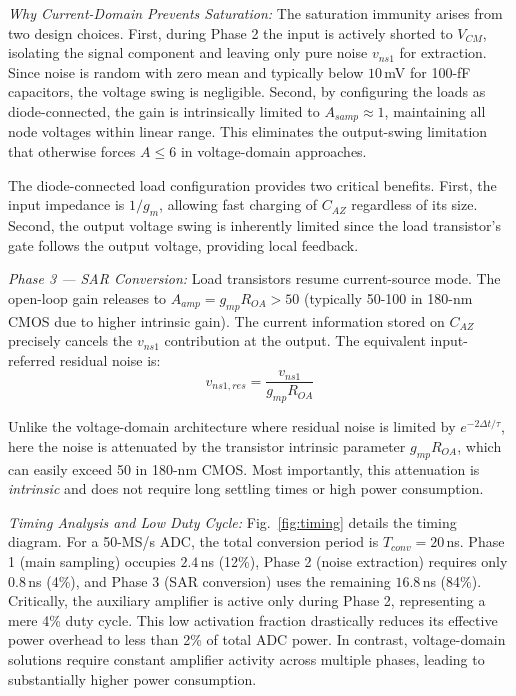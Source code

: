 \documentclass[journal]{IEEEtran}
\begin{document}
\textit{Why Current-Domain Prevents Saturation:} The saturation immunity arises from two design choices. First, during Phase 2 the input is actively shorted to $V_{CM}$, isolating the signal component and leaving only pure noise $v_{ns1}$ for extraction. Since noise is random with zero mean and typically below $10$\,mV for 100-fF capacitors, the voltage swing is negligible. Second, by configuring the loads as diode-connected, the gain is intrinsically limited to $A_{samp} \approx 1$, maintaining all node voltages within linear range. This eliminates the output-swing limitation that otherwise forces $A \leq 6$ in voltage-domain approaches.

The diode-connected load configuration provides two critical benefits. First, the input impedance is $1/g_m$, allowing fast charging of $C_{AZ}$ regardless of its size. Second, the output voltage swing is inherently limited since the load transistor's gate follows the output voltage, providing local feedback.

\textit{Phase 3 --- SAR Conversion:} Load transistors resume current-source mode. The open-loop gain releases to $A_{amp} = g_{mp}R_{OA} > 50$ (typically 50-100 in 180-nm CMOS due to higher intrinsic gain). The current information stored on $C_{AZ}$ precisely cancels the $v_{ns1}$ contribution at the output. The equivalent input-referred residual noise is:
\begin{equation}
v_{ns1,res} = \frac{v_{ns1}}{g_{mp}R_{OA}}
\label{eq:residual_current}
\end{equation}

Unlike the voltage-domain architecture where residual noise is limited by $e^{-2\Delta t/\tau}$, here the noise is attenuated by the transistor intrinsic parameter $g_{mp}R_{OA}$, which can easily exceed 50 in 180-nm CMOS. Most importantly, this attenuation is \textit{intrinsic} and does not require long settling times or high power consumption.

\textit{Timing Analysis and Low Duty Cycle:} Fig.~\ref{fig:timing} details the timing diagram. For a 50-MS/s ADC, the total conversion period is $T_{conv} = 20$\,ns. Phase 1 (main sampling) occupies $2.4$\,ns (12\%), Phase 2 (noise extraction) requires only $0.8$\,ns (4\%), and Phase 3 (SAR conversion) uses the remaining $16.8$\,ns (84\%). Critically, the auxiliary amplifier is active only during Phase 2, representing a mere 4\% duty cycle. This low activation fraction drastically reduces its effective power overhead to less than 2\% of total ADC power. In contrast, voltage-domain solutions require constant amplifier activity across multiple phases, leading to substantially higher power consumption.
\end{document}
